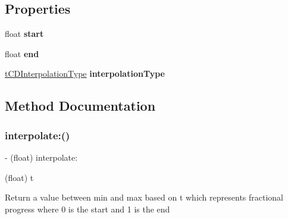 \subsection*{Properties}
\begin{DoxyCompactItemize}
\item 
\mbox{\label{interfaceCDFloatInterpolator_a34b39655f8b06ade736ebad6124d197c}} 
float {\bfseries start}
\item 
\mbox{\label{interfaceCDFloatInterpolator_a327e4b9968a8e240e1db452c872512b0}} 
float {\bfseries end}
\item 
\mbox{\label{interfaceCDFloatInterpolator_a356a694d7fd238f2e7424595f79d05be}} 
\hyperlink{cocos2d_2cocos_2audio_2ios_2CocosDenshion_8h_abf5e3c49618c14630377c3696e7a3ab9}{t\+C\+D\+Interpolation\+Type} {\bfseries interpolation\+Type}
\end{DoxyCompactItemize}


\subsection{Method Documentation}
\mbox{\label{interfaceCDFloatInterpolator_a0eff31af0006d4602c728fc6fbd7e755}} 
\subsubsection{\texorpdfstring{interpolate\+:()}{interpolate:()}\hspace{0.1cm}{\footnotesize\ttfamily [1/4]}}
{\footnotesize\ttfamily -\/ (float) interpolate\+: \begin{DoxyParamCaption}\item[{(float)}]{t }\end{DoxyParamCaption}}

Return a value between min and max based on t which represents fractional progress where 0 is the start and 1 is the end \mbox{\label{interfaceCDFloatInterpolator_a0eff31af0006d4602c728fc6fbd7e755}} 
